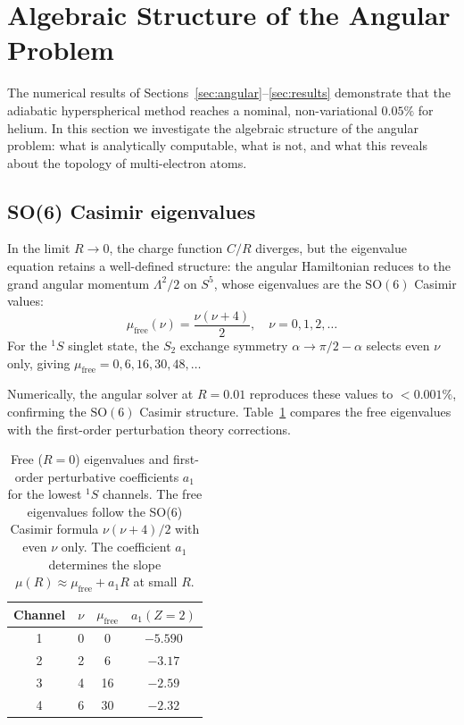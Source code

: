 \documentclass[aps,pra,twocolumn,superscriptaddress,longbibliography]{revtex4-2}
\begin{document}
\section{Algebraic Structure of the Angular Problem}
\label{sec:algebraic}

The numerical results of Sections~\ref{sec:angular}--\ref{sec:results}
demonstrate that the adiabatic hyperspherical method reaches a
nominal, non-variational $0.05\%$ for helium.  In this section we investigate the algebraic
structure of the angular problem: what is analytically computable,
what is not, and what this reveals about the topology of multi-electron
atoms.

\subsection{SO(6) Casimir eigenvalues}
\label{sec:casimir}

In the limit $R \to 0$, the charge function $C/R$ diverges, but
the eigenvalue equation retains a well-defined structure: the
angular Hamiltonian reduces to the grand angular momentum
$\Lambda^2/2$ on $S^5$, whose eigenvalues are the $\mathrm{SO}(6)$
Casimir values:
\begin{equation}
  \mu_{\mathrm{free}}(\nu) = \frac{\nu(\nu + 4)}{2},
  \quad \nu = 0, 1, 2, \ldots
  \label{eq:mu_free}
\end{equation}
For the ${}^1S$ singlet state, the $S_2$ exchange symmetry
$\alpha \to \pi/2 - \alpha$ selects even $\nu$ only, giving
$\mu_{\mathrm{free}} = 0, 6, 16, 30, 48, \ldots$

Numerically, the angular solver at $R = 0.01$ reproduces these
values to $< 0.001\%$, confirming the $\mathrm{SO}(6)$ Casimir
structure.  Table~\ref{tab:casimir} compares the free eigenvalues
with the first-order perturbation theory corrections.

\begin{table}[h]
\caption{Free ($R = 0$) eigenvalues and first-order perturbative
coefficients $a_1$ for the lowest ${}^1S$ channels.  The free
eigenvalues follow the SO(6) Casimir formula $\nu(\nu+4)/2$ with
even $\nu$ only.  The coefficient $a_1$ determines the slope
$\mu(R) \approx \mu_{\mathrm{free}} + a_1 R$ at small $R$.}
\label{tab:casimir}
\begin{ruledtabular}
\begin{tabular}{cccc}
  Channel & $\nu$ & $\mu_{\mathrm{free}}$ & $a_1(Z{=}2)$ \\
  \hline
  1 & 0 & 0     & $-5.590$ \\
  2 & 2 & 6     & $-3.17$ \\
  3 & 4 & 16    & $-2.59$ \\
  4 & 6 & 30    & $-2.32$ \\
\end{tabular}
\end{ruledtabular}
\end{table}
\end{document}
